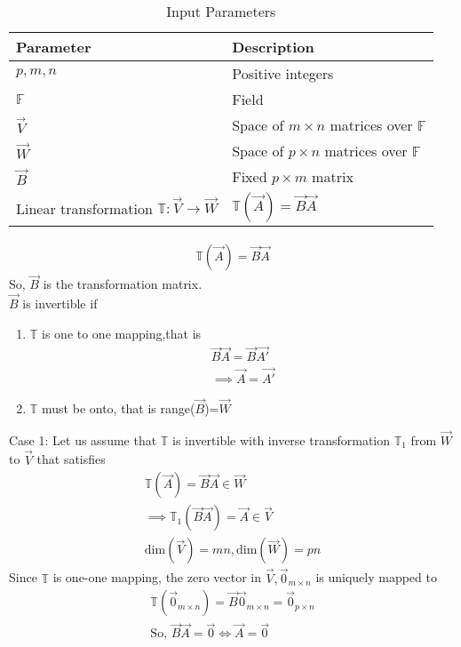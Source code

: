 \begin{table}[!ht]
\centering
\resizebox{\columnwidth}{!}
{
\begin{tabular}{|p{3.7cm}|p{4cm}|}
\hline
\textbf{Parameter}&\textbf{Description}\\
\hline
$p,m,n$&Positive integers\\
\hline
$\mathbb{F}$&Field\\
\hline
$\vec{V}$&Space of $m\times n$ matrices over $\mathbb{F}$\\
\hline
$\vec{W}$&Space of $p\times n$ matrices over $\mathbb{F}$\\
\hline
$\vec{B}$&Fixed $p\times m$ matrix\\
\hline
Linear transformation  $\mathbb{T}:\vec{V} \rightarrow \vec{W}$&$ \mathbb{T}(\vec{A})=\vec{B}\vec{A}$\\
\hline
\end{tabular}
}
\caption{Input Parameters}
\end{table}
\begin{align}
    \mathbb{T}(\vec{A})=\vec{B}\vec{A}
\end{align}
So, $\vec{B}$ is the transformation matrix.\\
$\vec{B}$ is invertible if
\begin{enumerate}
    \item $\mathbb{T}$ is one to one mapping,that is
    \begin{align}
       \vec{B}\vec{A}=\vec{B}\vec{A'}\\
       \implies \vec{A}=\vec{A'}
    \end{align}
    \item $\mathbb{T}$ must be onto, that is range($\vec{B}$)=$\vec{W}$ 
\end{enumerate}
{Case 1: }
Let us assume that $\mathbb{T}$ is invertible with inverse transformation $\mathbb{T}_1$ from $\vec{W}$ to $\vec{V}$ that satisfies
\begin{align}
  \mathbb{T}(\vec{A})=\vec{B}\vec{A} \in \vec{W}\\
  \implies \mathbb{T}_1(\vec{B}\vec{A})=\vec{A} \in \vec{V}\\
  \text{dim}(\vec{V})=mn, \text{dim}(\vec{W})=pn\label{eq:solutions/3/2/12/1}
\end{align}
Since $ \mathbb{T}$ is one-one mapping, the zero vector in $\vec{V}, \vec{0}_{m \times n}$ is uniquely mapped to 
\begin{align}
   \mathbb{T}(\vec{0}_{m \times n})= \vec{B} \vec{0}_{m \times n}=\vec{0}_{p \times n}\\
     \text{So, }\vec{B}\vec{A}=\vec{0} \iff \vec{A}=\vec{0}\label{eq:solutions/3/2/12/3}
\end{align}
